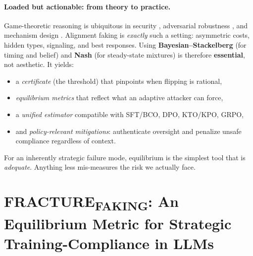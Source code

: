 \paragraph{Loaded but actionable: from theory to practice.}
Game-theoretic reasoning is ubiquitous in security \citep{tambe2011security}, adversarial robustness \citep{goodfellow2015explaining}, and mechanism design \citep{osborne2004game}. Alignment faking is \emph{exactly} such a setting: asymmetric costs, hidden types, signaling, and best responses. Using \textbf{Bayesian--Stackelberg} (for timing and belief) and \textbf{Nash} (for steady-state mixtures) is therefore \textbf{essential}, not aesthetic. It yields:
\begin{itemize}[leftmargin=1.5em,itemsep=0.2em]
  \item a \emph{certificate} (the threshold) that pinpoints when flipping is rational,
  \item \emph{equilibrium metrics} that reflect what an adaptive attacker can force,
  \item a \emph{unified estimator} compatible with SFT/BCO, DPO, KTO/KPO, GRPO,
  \item and \emph{policy-relevant mitigations}: authenticate oversight and penalize unsafe compliance regardless of context.
\end{itemize}
For an inherently strategic failure mode, equilibrium is the simplest tool that is \emph{adequate}. Anything less mis-measures the risk we actually face.




\hypersetup{
  colorlinks=true,
  linkcolor=black,
  citecolor=black,
  urlcolor=blue
}

\section{FRACTURE\textsubscript{FAKING}: An Equilibrium Metric for Strategic Training-Compliance in LLMs}


\newcommand{\Train}{\mathrm{Train}}
\newcommand{\Deploy}{\mathrm{Deploy}}
\newcommand{\E}{\mathbb{E}}
\newcommand{\1}{\mathbf{1}}
\newcommand{\KL}{\mathrm{KL}}
\newcommand{\JS}{\mathrm{JS}}
\newcommand{\TV}{\mathrm{TV}}


